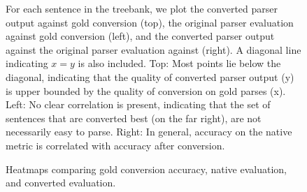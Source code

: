 \begin{figure}
	\caption{
		\label{fig:scatter_plots}
		Heatmaps comparing gold conversion accuracy, \ccg native evaluation, and converted evaluation.
  }{
		For each sentence in the treebank, we plot the converted parser output against gold conversion (top), the original parser evaluation against gold conversion (left), and the converted parser output against the original parser evaluation against (right).
		A diagonal line indicating $x=y$ is also included.
		Top: Most points lie below the diagonal, indicating that the quality of converted parser output (y) is upper bounded by the quality of conversion on gold parses (x).
		Left: No clear correlation is present, indicating that the set of sentences that are converted best (on the far right), are not necessarily easy to parse.
		Right: In general, accuracy on the native metric is correlated with accuracy after conversion.
	}
\end{figure}

